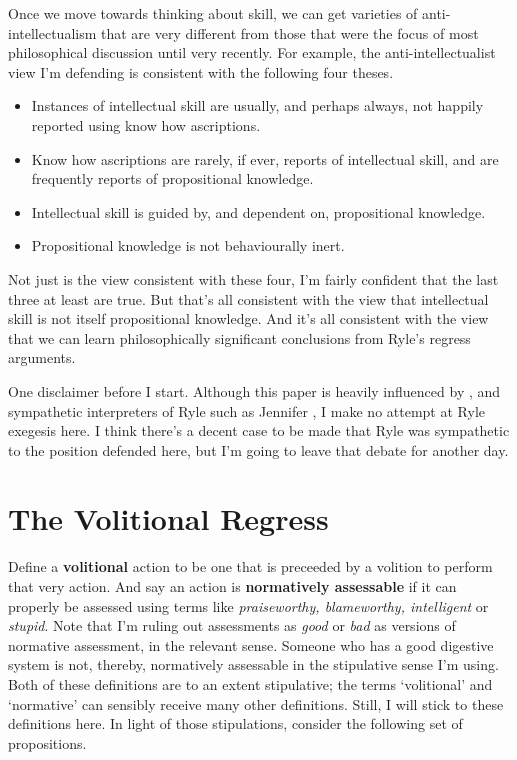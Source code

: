 Once we move towards thinking about skill, we can get varieties of anti-intellect\-ual\-ism that are very different from those that were the focus of most philosophical discussion until very recently. For example, the anti-intellectualist view I'm defending is consistent with the following four theses.

\begin{itemize}
\item Instances of intellectual skill are usually, and perhaps always, not happily reported using know how ascriptions.

\item Know how ascriptions are rarely, if ever, reports of intellectual skill, and are frequently reports of propositional knowledge.

\item Intellectual skill is guided by, and dependent on, propositional knowledge.

\item Propositional knowledge is not behaviourally inert.

\end{itemize}
%
Not just is the view consistent with these four, I'm fairly confident that the last three at least are true. But that's all consistent with the view that intellectual skill is not itself propositional knowledge. And it's all consistent with the view that we can learn philosophically significant conclusions from Ryle's regress arguments.

One disclaimer before I start. Although this paper is heavily influenced by \citet{Ryle1945, Ryle1949}, and sympathetic interpreters of Ryle such as Jennifer \citet{Hornsby2011}, I make no attempt at Ryle exegesis here. I think there's a decent case to be made that Ryle was sympathetic to the position defended here, but I'm going to leave that debate for another day.

\section{The Volitional Regress}

Define a \textbf{volitional} action to be one that is preceeded by a volition to perform that very action. And say an action is \textbf{normatively assessable} if it can properly be assessed using terms like \textit{praiseworthy, blameworthy, intelligent} or \textit{stupid}. Note that I'm ruling out assessments as \textit{good} or \textit{bad} as versions of normative assessment, in the relevant sense. Someone who has a good digestive system is not, thereby, normatively assessable in the stipulative sense I'm using. Both of these definitions are to an extent stipulative; the terms `volitional' and `normative' can sensibly receive many other definitions. Still, I will stick to these definitions here. In light of those stipulations, consider the following set of propositions.

